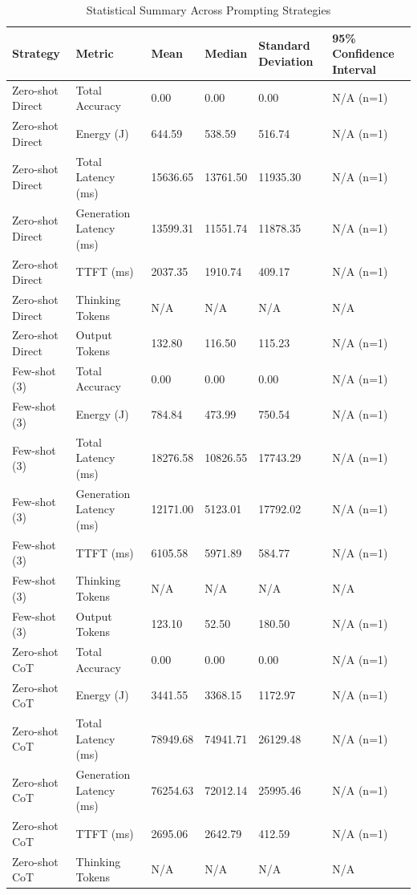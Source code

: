 \begin{table}
\caption{Statistical Summary Across Prompting Strategies}
\label{tab:statistical_summary}
\begin{tabular}{llllll}
\toprule
Strategy & Metric & Mean & Median & Standard Deviation & 95\% Confidence Interval \\
\midrule
Zero-shot Direct & Total Accuracy & 0.00 & 0.00 & 0.00 & N/A (n=1) \\
Zero-shot Direct & Energy (J) & 644.59 & 538.59 & 516.74 & N/A (n=1) \\
Zero-shot Direct & Total Latency (ms) & 15636.65 & 13761.50 & 11935.30 & N/A (n=1) \\
Zero-shot Direct & Generation Latency (ms) & 13599.31 & 11551.74 & 11878.35 & N/A (n=1) \\
Zero-shot Direct & TTFT (ms) & 2037.35 & 1910.74 & 409.17 & N/A (n=1) \\
Zero-shot Direct & Thinking Tokens & N/A & N/A & N/A & N/A \\
Zero-shot Direct & Output Tokens & 132.80 & 116.50 & 115.23 & N/A (n=1) \\
Few-shot (3) & Total Accuracy & 0.00 & 0.00 & 0.00 & N/A (n=1) \\
Few-shot (3) & Energy (J) & 784.84 & 473.99 & 750.54 & N/A (n=1) \\
Few-shot (3) & Total Latency (ms) & 18276.58 & 10826.55 & 17743.29 & N/A (n=1) \\
Few-shot (3) & Generation Latency (ms) & 12171.00 & 5123.01 & 17792.02 & N/A (n=1) \\
Few-shot (3) & TTFT (ms) & 6105.58 & 5971.89 & 584.77 & N/A (n=1) \\
Few-shot (3) & Thinking Tokens & N/A & N/A & N/A & N/A \\
Few-shot (3) & Output Tokens & 123.10 & 52.50 & 180.50 & N/A (n=1) \\
Zero-shot CoT & Total Accuracy & 0.00 & 0.00 & 0.00 & N/A (n=1) \\
Zero-shot CoT & Energy (J) & 3441.55 & 3368.15 & 1172.97 & N/A (n=1) \\
Zero-shot CoT & Total Latency (ms) & 78949.68 & 74941.71 & 26129.48 & N/A (n=1) \\
Zero-shot CoT & Generation Latency (ms) & 76254.63 & 72012.14 & 25995.46 & N/A (n=1) \\
Zero-shot CoT & TTFT (ms) & 2695.06 & 2642.79 & 412.59 & N/A (n=1) \\
Zero-shot CoT & Thinking Tokens & N/A & N/A & N/A & N/A \\

\end{tabular}
\end{table}
